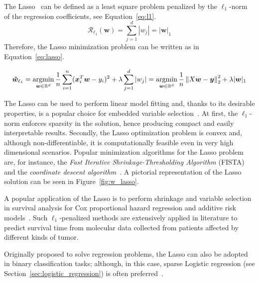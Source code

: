 			The Lasso~\cite{tibshirani1996regression} can be defined as a least square problem penalized by the $\ell_1$-norm of the regression coefficients, see Equation~\eqref{eq:l1}.
			\begin{equation}\label{eq:l1}
				\mathcal{R}_{\mbox{$\ell_1$}}(\bm{w}) = \sum_{j=1}^d |w_j| = |\bm{w}|_1
			\end{equation}
			Therefore, the Lasso minimization problem can be written as in Equation~\eqref{eq:lasso}.

			\begin{equation} \label{eq:lasso}
				\bm{\hat w}_{\ell_1} = \mathop{\mathrm{argmin}}\limits_{\bm{w} \in \mathbb{R}^d} \frac{1}{n} \sum_{i=1}^n (\bm{x}_i^T\bm{w} - y_i)^2 + \lambda  \sum_{j=1}^d |w_j| = \mathop{\mathrm{argmin}}\limits_{\bm{w} \in \mathbb{R}^d} \frac{1}{n} \left\lVert X\bm{w} - \bm{y}\right\rVert_2^2 + \lambda |\bm{w}|_1
			\end{equation}

			The Lasso can be used to perform linear model fitting and, thanks to its desirable properties, is a popular choice for embedded variable selection~\cite{guyon2003introduction}. At first, the $\ell_1$-norm enforces sparsity in the solution, hence producing compact and easily interpretable results. Secondly, the Lasso optimization problem is convex and, although non-differentiable, it is computationally feasible even in very high dimensional scenarios. Popular minimization algorithms for the Lasso problem are, for instance, the \textit{Fast Iterative Shrinkage-Thresholding Algorithm}  (\ac{FISTA})~\cite{beck2009fast} and the \textit{coordinate descent algorithm}~\cite{wu2008coordinate}. A pictorial representation of the Lasso solution can be seen in Figure~\ref{fig:w_lasso}.

			A popular application of the Lasso is to perform shrinkage and variable selection in survival analysis for Cox proportional hazard regression \cite{tang2017spike, gui2005penalized, tibshirani1997lasso} and additive risk models~\cite{ma2007additive}.
			Such $\ell_1$-penalized methods are extensively applied in literature to predict survival time from molecular data collected from patients affected by different kinds of tumor.

			Originally proposed to solve regression problems, the Lasso can also be adopted in binary classification tasks; although, in this case, sparse Logistic regression (see Section~\eqref{sec:logistic_regression}) is often preferred~\cite{tong2009genome}.

